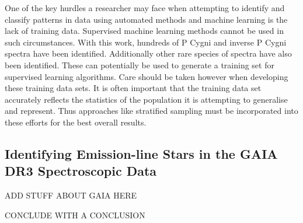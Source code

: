 One of the key hurdles a researcher may face when attempting to identify and classify patterns in data using automated methods and machine learning is the lack of training data. Supervised machine learning methods cannot be used in such circumstances. With this work, hundreds of P Cygni and inverse P Cygni spectra have been identified. Additionally other rare species of spectra have also been identified. These can potentially be used to generate a training set for supervised learning algorithms. Care should be taken however when developing these training data sets. It is often important that the training data set accurately reflects the statistics of the population it is attempting to generalise and represent. Thus approaches like stratified sampling must be incorporated into these efforts for the best overall results. 

\subsection{Identifying Emission-line Stars in the GAIA DR3 Spectroscopic Data}

ADD STUFF ABOUT GAIA HERE

CONCLUDE WITH A CONCLUSION 
